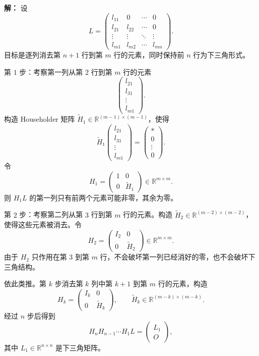 \documentclass[11pt]{article}
\newcommand{\R}{\mathbb{R}}
\newenvironment{solution}{\par\noindent\textbf{解：}}{\par}
\begin{document}
\begin{enumerate}
\begin{solution}
设
\[
L=
\begin{pmatrix}
l_{11}&0&\cdots&0\\
l_{21}&l_{22}&\cdots&0\\
\vdots&\vdots&\ddots&\vdots\\
l_{m1}&l_{m2}&\cdots&l_{mn}
\end{pmatrix}.
\]
目标是逐列消去第 \(n+1\) 行到第 \(m\) 行的元素，同时保持前 \(n\) 行为下三角形式。

第 \(1\) 步：考察第一列从第 \(2\) 行到第 \(m\) 行的元素
\[
\begin{pmatrix}
l_{21}\\
l_{31}\\
\vdots\\
l_{m1}
\end{pmatrix}.
\]
构造 Householder 矩阵 \(\widetilde H_1\in\R^{(m-1)\times(m-1)}\)，使得
\[
\widetilde H_1
\begin{pmatrix}
l_{21}\\
l_{31}\\
\vdots\\
l_{m1}
\end{pmatrix}
=
\begin{pmatrix}
*\\
0\\
\vdots\\
0
\end{pmatrix}.
\]
令
\[
H_1=
\begin{pmatrix}
1&0\\
0&\widetilde H_1
\end{pmatrix}
\in\R^{m\times m}.
\]
则 \(H_1L\) 的第一列只有前两个元素可能非零，其余为零。

第 \(2\) 步：考察第二列从第 \(3\) 行到第 \(m\) 行的元素。构造
\(\widetilde H_2\in\R^{(m-2)\times(m-2)}\)，使得这些元素被消去。令
\[
H_2=
\begin{pmatrix}
I_2&0\\
0&\widetilde H_2
\end{pmatrix}
\in\R^{m\times m}.
\]
由于 \(H_2\) 只作用在第 \(3\) 到第 \(m\) 行，不会破坏第一列已经消好的零，也不会破坏下三角结构。

依此类推。第 \(k\) 步消去第 \(k\) 列中第 \(k+1\) 到第 \(m\) 行的元素，构造
\[
H_k=
\begin{pmatrix}
I_k&0\\
0&\widetilde H_k
\end{pmatrix},
\qquad
\widetilde H_k\in\R^{(m-k)\times(m-k)}.
\]
经过 \(n\) 步后得到
\[
H_nH_{n-1}\cdots H_1L=
\begin{pmatrix}
L_1\\
O
\end{pmatrix},
\]
其中 \(L_1\in\R^{n\times n}\) 是下三角矩阵。


\end{solution}
\end{enumerate}
\end{document}
